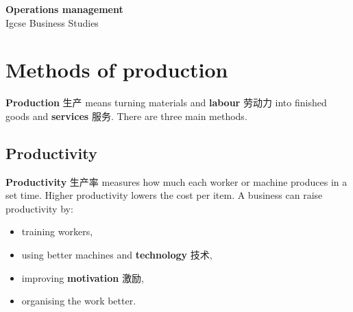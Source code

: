 \documentclass[11pt]{article}
\begin{document}
\begin{center}
  {\LARGE\bfseries Operations management}\\[0.35em]
  {\large Igcse Business Studies}
\end{center}
\vspace{0.6em}

\section*{Methods of production}

\textbf{Production} 生产 means turning materials and \textbf{labour} 劳动力 into finished goods and \textbf{services} 服务. There are three main methods.

\begin{center}
\end{center}

\subsection*{Productivity}

\textbf{Productivity} 生产率 measures how much each worker or machine produces in a set time. Higher productivity lowers the cost per item. A business can raise productivity by:

\begin{itemize}
\item training workers,

\item using better machines and \textbf{technology} 技术,

\item improving \textbf{motivation} 激励,

\item organising the work better.

\end{itemize}
\end{document}
